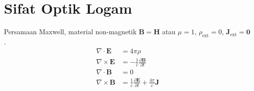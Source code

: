 \chapter{Sifat Optik Logam}

Persamaan Maxwell, material non-magnetik $\mathbf{B} = \mathbf{H}$ atau $\mu = 1$,
$\rho_{\mathrm{ext}} = 0$, $\mathbf{J}_{\mathrm{ext}} = \mathbf{0}$.
\begin{align}
\nabla \cdot \mathbf{E} & = 4\pi\rho \\
\nabla \times \mathbf{E} & = -\frac{1}{c}\frac{\partial \mathbf{B}}{\partial t} \\
\nabla \cdot \mathbf{B} & = 0 \\
\nabla \times \mathbf{B} & = \frac{1}{c} \frac{\partial\mathbf{E}}{\partial t} +
\frac{4\pi}{c}\mathbf{J}
\end{align}